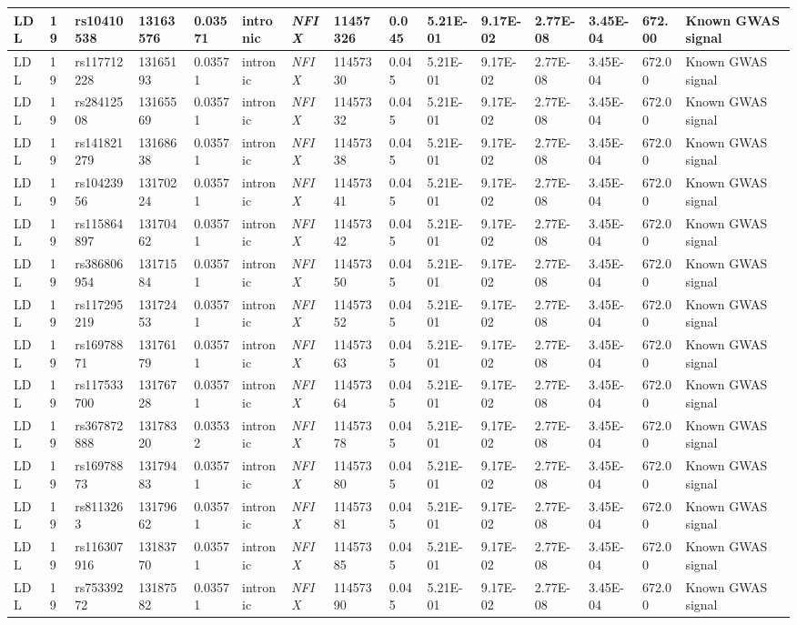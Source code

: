 \begin{landscape}
\begin{table}
\begin{adjustbox}{max width=\linewidth}
\begin{tabular}{@{}p{2cm}|p{0.5cm}p{2cm}p{2cm}p{1.5cm}p{3cm}p{2.1cm}p{1.5cm}p{1cm}p{2cm}p{2cm}p{2cm}p{2cm}p{1.5cm}p{4cm}@{}}
LDL&19&rs10410538&13163576&0.03571&intronic&\emph{NFIX}&11457326&0.045&5.21E-01&9.17E-02&2.77E-08&3.45E-04&672.00&Known GWAS signal \\ \hline
LDL&19&rs117712228&13165193&0.03571&intronic&\emph{NFIX}&11457330&0.045&5.21E-01&9.17E-02&2.77E-08&3.45E-04&672.00&Known GWAS signal \\ \hline
LDL&19&rs28412508&13165569&0.03571&intronic&\emph{NFIX}&11457332&0.045&5.21E-01&9.17E-02&2.77E-08&3.45E-04&672.00&Known GWAS signal \\ \hline
LDL&19&rs141821279&13168638&0.03571&intronic&\emph{NFIX}&11457338&0.045&5.21E-01&9.17E-02&2.77E-08&3.45E-04&672.00&Known GWAS signal \\ \hline
LDL&19&rs10423956&13170224&0.03571&intronic&\emph{NFIX}&11457341&0.045&5.21E-01&9.17E-02&2.77E-08&3.45E-04&672.00&Known GWAS signal \\ \hline
LDL&19&rs115864897&13170462&0.03571&intronic&\emph{NFIX}&11457342&0.045&5.21E-01&9.17E-02&2.77E-08&3.45E-04&672.00&Known GWAS signal \\ \hline
LDL&19&rs386806954&13171584&0.03571&intronic&\emph{NFIX}&11457350&0.045&5.21E-01&9.17E-02&2.77E-08&3.45E-04&672.00&Known GWAS signal\\ \hline
LDL&19&rs117295219&13172453&0.03571&intronic&\emph{NFIX}&11457352&0.045&5.21E-01&9.17E-02&2.77E-08&3.45E-04&672.00&Known GWAS signal\\ \hline
LDL&19&rs16978871&13176179&0.03571&intronic&\emph{NFIX}&11457363&0.045&5.21E-01&9.17E-02&2.77E-08&3.45E-04&672.00&Known GWAS signal\\ \hline
LDL&19&rs117533700&13176728&0.03571&intronic&\emph{NFIX}&11457364&0.045&5.21E-01&9.17E-02&2.77E-08&3.45E-04&672.00&Known GWAS signal\\ \hline
LDL&19&rs367872888&13178320&0.03532&intronic&\emph{NFIX}&11457378&0.045&5.21E-01&9.17E-02&2.77E-08&3.45E-04&672.00&Known GWAS signal\\ \hline
LDL&19&rs16978873&13179483&0.03571&intronic&\emph{NFIX}&11457380&0.045&5.21E-01&9.17E-02&2.77E-08&3.45E-04&672.00&Known GWAS signal\\ \hline
LDL&19&rs8113263&13179662&0.03571&intronic&\emph{NFIX}&11457381&0.045&5.21E-01&9.17E-02&2.77E-08&3.45E-04&672.00&Known GWAS signal\\ \hline
LDL&19&rs116307916&13183770&0.03571&intronic&\emph{NFIX}&11457385&0.045&5.21E-01&9.17E-02&2.77E-08&3.45E-04&672.00&Known GWAS signal\\ \hline
LDL&19&rs75339272&13187582&0.03571&intronic&\emph{NFIX}&11457390&0.045&5.21E-01&9.17E-02&2.77E-08&3.45E-04&672.00&Known GWAS signal\\ \hline

\end{tabular}
\end{adjustbox}
\end{table}
\end{landscape}
